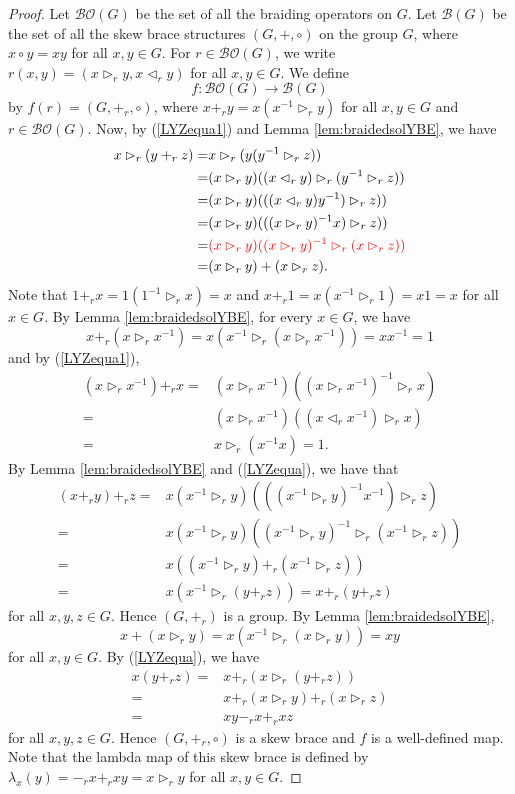\begin{proof}
    Let $\mathcal{BO}(G)$ be the set of all the braiding operators on $G$. Let $\mathcal{B}(G)$ be the set of all the skew brace structures $(G,+,\circ)$ on the group $G$, where $x\circ y=xy$ for all $x,y\in G$. For $r\in \mathcal{BO}(G)$, we write $r(x,y)=(x\rhd_r y,x\lhd_r y)$ for all $x,y\in G$. We define
    \[ f\colon \mathcal{BO}(G)\rightarrow \mathcal{B}(G)\]
    by $f(r)=(G,+_r,\circ)$, where $x+_r y=x(x^{-1}\rhd_r y)$ for all $x,y\in G$ and $r\in \mathcal{BO}(G)$. Now, by (\ref{LYZequa1}) and Lemma \ref{lem:braidedsolYBE}, we have
    \begin{align}\label{LYZequa}
        x\rhd_r (y+_r z)=&x\rhd_r(y(y^{-1}\rhd_r z))\nonumber\\
        =&(x\rhd_r y)((x\lhd_r y)\rhd_r (y^{-1}\rhd_r z))\nonumber\\
        =&(x\rhd_r y)(((x\lhd_r y)y^{-1})\rhd_r z))\nonumber\\
        =&(x\rhd_r y)(((x\rhd_r y)^{-1}x)\rhd_r z))\nonumber\\
        =&\textcolor{red}{(x\rhd_r y)((x\rhd_r y)^{-1}\rhd_r(x\rhd_r z))}\nonumber\\
        =&(x\rhd_r y)+(x\rhd_r z).
    \end{align}
    Note that $1+_r x=1(1^{-1}\rhd_r x)=x$ and
    $x+_r 1=x(x^{-1}\rhd_r 1)=x1=x$  for all $x\in G$. By Lemma \ref{lem:braidedsolYBE},  for every $x\in G$, we have
    \[x+_r (x\rhd_r x^{-1})=x(x^{-1}\rhd_r(x\rhd_r x^{-1}))=xx^{-1}=1\]
and by (\ref{LYZequa1}),
\begin{align*}
    (x\rhd_r x^{-1})+_r x=&(x\rhd_r x^{-1})((x\rhd_r x^{-1})^{-1}\rhd_r x)\\
    =&(x\rhd_r x^{-1})((x\lhd_r x^{-1})\rhd_r x)\\
    =&x\rhd_r(x^{-1}x)=1.
\end{align*}
By Lemma \ref{lem:braidedsolYBE} and (\ref{LYZequa}), we have that
\begin{align*}
    (x+_r y)+_r z=&x(x^{-1}\rhd_r y)(((x^{-1}\rhd_r y)^{-1}x^{-1})\rhd_r z)\\
    =&x(x^{-1}\rhd_r y)((x^{-1}\rhd_r y)^{-1}\rhd_r (x^{-1}\rhd_r z))\\
    =&x((x^{-1}\rhd_r y)+_r(x^{-1}\rhd_r z))\\
    =&x(x^{-1}\rhd_r(y+_r z))=x+_r (y+_r z)
\end{align*}
for all $x,y,z\in G$. Hence $(G,+_r)$ is a group. By Lemma \ref{lem:braidedsolYBE}, 
\[x+(x\rhd_r y)=x(x^{-1}\rhd_r(x\rhd_r y))=xy\]
for all $x,y\in G$.
By (\ref{LYZequa}), we have
\begin{align*}
    x(y+_r z)=&x+_r(x\rhd_r (y+_r z))\\
    =&x+_r (x\rhd_r y)+_r(x\rhd_r z)\\
    =&xy-_r x+_r xz
\end{align*}
for all $x,y,z\in G$. Hence $(G,+_r,\circ)$ is a skew brace and $f$ is a well-defined map. Note that the lambda map of this skew brace is defined by
$\lambda_x(y)=-_r x+_r xy=x\rhd_r y$ for all $x,y\in G$.


\end{proof}

